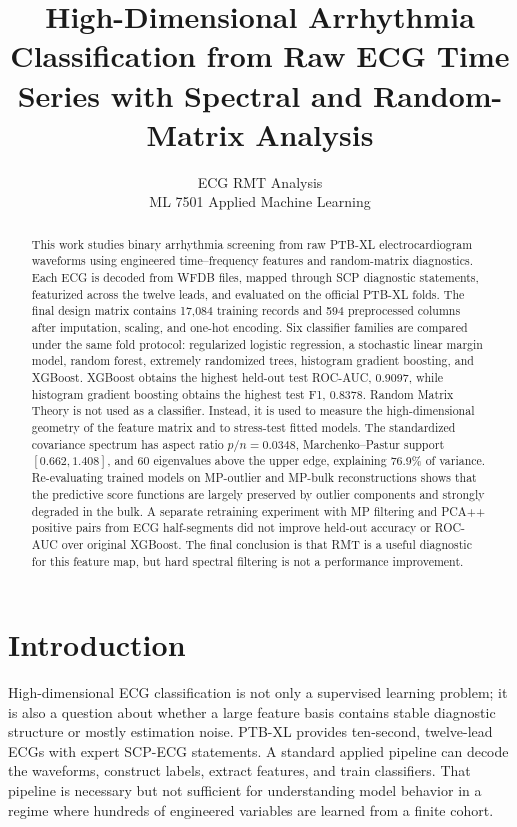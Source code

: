 \documentclass{article}
\title{High-Dimensional Arrhythmia Classification from Raw ECG Time Series with Spectral and Random-Matrix Analysis}
\author{%
  ECG RMT Analysis \\
  ML 7501 Applied Machine Learning
}
\begin{document}
\maketitle

\begin{abstract}
This work studies binary arrhythmia screening from raw PTB-XL electrocardiogram waveforms using engineered time--frequency features and random-matrix diagnostics. Each ECG is decoded from WFDB files, mapped through SCP diagnostic statements, featurized across the twelve leads, and evaluated on the official PTB-XL folds. The final design matrix contains 17,084 training records and 594 preprocessed columns after imputation, scaling, and one-hot encoding. Six classifier families are compared under the same fold protocol: regularized logistic regression, a stochastic linear margin model, random forest, extremely randomized trees, histogram gradient boosting, and XGBoost. XGBoost obtains the highest held-out test ROC-AUC, 0.9097, while histogram gradient boosting obtains the highest test F1, 0.8378. Random Matrix Theory is not used as a classifier. Instead, it is used to measure the high-dimensional geometry of the feature matrix and to stress-test fitted models. The standardized covariance spectrum has aspect ratio \(p/n=0.0348\), Marchenko--Pastur support \([0.662,1.408]\), and 60 eigenvalues above the upper edge, explaining 76.9\% of variance. Re-evaluating trained models on MP-outlier and MP-bulk reconstructions shows that the predictive score functions are largely preserved by outlier components and strongly degraded in the bulk. A separate retraining experiment with MP filtering and PCA++ positive pairs from ECG half-segments did not improve held-out accuracy or ROC-AUC over original XGBoost. The final conclusion is that RMT is a useful diagnostic for this feature map, but hard spectral filtering is not a performance improvement.
\end{abstract}

\section{Introduction}

High-dimensional ECG classification is not only a supervised learning problem; it is also a question about whether a large feature basis contains stable diagnostic structure or mostly estimation noise. PTB-XL provides ten-second, twelve-lead ECGs with expert SCP-ECG statements. A standard applied pipeline can decode the waveforms, construct labels, extract features, and train classifiers. That pipeline is necessary but not sufficient for understanding model behavior in a regime where hundreds of engineered variables are learned from a finite cohort.
\end{document}
